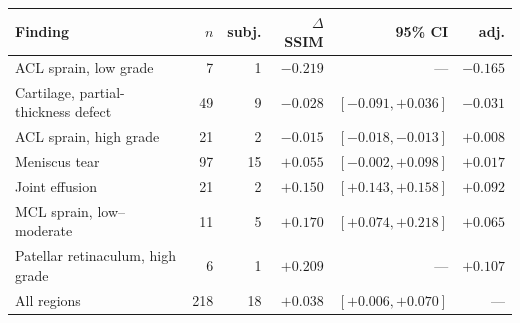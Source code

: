 \begin{tabular}{lrrrrr}
\toprule
Finding & $n$ & subj. & $\Delta$SSIM & 95\% CI & adj. \\
\midrule
ACL sprain, low grade & 7 & 1 & $-0.219$ & --- & $-0.165$ \\
Cartilage, partial-thickness defect & 49 & 9 & $-0.028$ & $[-0.091,+0.036]$ & $-0.031$ \\
ACL sprain, high grade & 21 & 2 & $-0.015$ & $[-0.018,-0.013]$ & $+0.008$ \\
Meniscus tear & 97 & 15 & $+0.055$ & $[-0.002,+0.098]$ & $+0.017$ \\
Joint effusion & 21 & 2 & $+0.150$ & $[+0.143,+0.158]$ & $+0.092$ \\
MCL sprain, low--moderate & 11 & 5 & $+0.170$ & $[+0.074,+0.218]$ & $+0.065$ \\
Patellar retinaculum, high grade & 6 & 1 & $+0.209$ & --- & $+0.107$ \\
\midrule
All regions & 218 & 18 & $+0.038$ & $[+0.006,+0.070]$ & --- \\
\bottomrule
\end{tabular}
